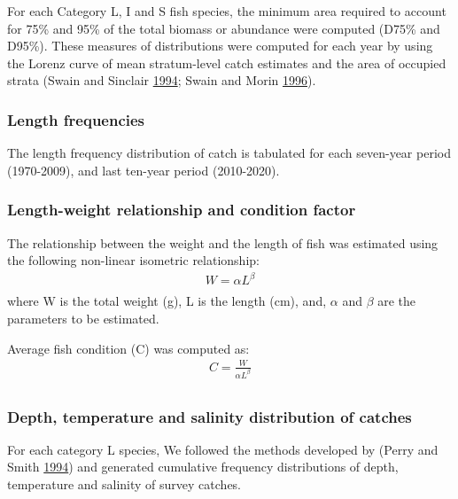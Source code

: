 \documentclass[12pt]{article}\usepackage[]{graphicx}\usepackage[]{color}
\begin{document}
For each Category L, I and S fish species, the minimum area required to account for 75\% and 95\% of the total biomass or abundance were computed (D75\% and D95\%). These measures of distributions were computed for each year by using the Lorenz curve of mean stratum-level catch estimates and the area of occupied strata (Swain and Sinclair \protect\hyperlink{ref-Swain:Sinclair:1994:cjfas}{1994}; Swain and Morin \protect\hyperlink{ref-Swain:Morin:1996:cjfas}{1996}).

\hypertarget{length-frequencies}{%
\subsubsection{Length frequencies}\label{length-frequencies}}

The length frequency distribution of catch is tabulated for each seven-year period (1970-2009), and last ten-year period (2010-2020).

\hypertarget{length-weight-relationship-and-condition-factor}{%
\subsubsection{Length-weight relationship and condition factor}\label{length-weight-relationship-and-condition-factor}}

The relationship between the weight and the length of fish was estimated using the following non-linear isometric relationship:
\begin{eqnarray*}\label{eqLengthWeight}
W = \alpha L ^\beta  
\\
\end{eqnarray*}
where W is the total weight (g), L is the length (cm), and, \(\alpha\) and \(\beta\) are the parameters to be estimated.

Average fish condition (C) was computed as:
\begin{eqnarray*}\label{eqCondition}
C = \frac{W}{\alpha L ^\beta}  
\\
\end{eqnarray*}
\hypertarget{depth-temperature-and-salinity-distribution-of-catches}{%
\subsubsection{Depth, temperature and salinity distribution of catches}\label{depth-temperature-and-salinity-distribution-of-catches}}

For each category L species, We followed the methods developed by (Perry and Smith \protect\hyperlink{ref-Perry:Smith:1994:cjfas}{1994}) and generated cumulative frequency distributions of depth, temperature and salinity of survey catches.
\end{document}
